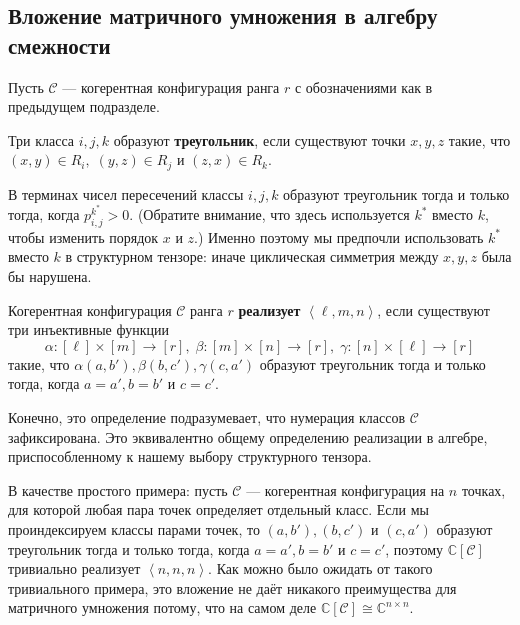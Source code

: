 \subsection{Вложение матричного умножения в алгебру смежности}\label{ssub:12:4.4}

Пусть $\mathscr{C}$ --- когерентная конфигурация ранга $r$ с обозначениями как в предыдущем подразделе.

\begin{definition}\label{def:12:4.4}
     Три класса $i,j,k$ образуют \textbf{треугольник}, если существуют точки $x,y,z$ такие, что $(x,y) \in R_i,\; (y,z) \in R_j$ и $(z,x) \in R_k$.
\end{definition}

В терминах чисел пересечений классы $i,j,k$ образуют треугольник тогда и только тогда, когда $p_{i,j}^{k^*} > 0$. (Обратите внимание, что здесь используется $k^*$ вместо $k$, чтобы изменить порядок $x$ и $z$.) Именно поэтому мы предпочли использовать $k^*$ вместо $k$ в структурном тензоре: иначе циклическая симметрия между $x,y,z$ была бы нарушена.

\begin{definition}\label{def:12:4.5}
     Когерентная конфигурация $\mathscr{C}$ ранга $r$ \textbf{реализует} $\left\langle \ell,m,n \right\rangle$, если существуют три инъективные функции
     \[
     	\alpha: [\ell] \times [m] \to [r], \; \beta: [m] \times [n] \to [r], \; \gamma: [n] \times [\ell] \to [r]
     \]
     такие, что $\alpha(a,b'), \beta(b,c'), \gamma(c,a')$ образуют треугольник тогда и только тогда, когда $a=a', b=b'$ и $c=c'$.
\end{definition}

Конечно, это определение подразумевает, что нумерация классов $\mathscr{C}$ зафиксирована. Это эквивалентно общему определению реализации в алгебре, приспособленному к нашему выбору структурного тензора.

\begin{example}\label{ex:12:4.6}
  В качестве простого примера: пусть $\mathscr{C}$ --- когерентная конфигурация на $n$ точках, для которой любая пара точек определяет отдельный класс. Если мы проиндексируем классы парами точек, то $(a,b'), (b,c')$ и $(c,a')$ образуют треугольник тогда и только тогда, когда $a=a',b=b'$ и $c=c'$, поэтому $\mathbb{C}[\mathscr{C}]$ тривиально реализует $\left\langle n,n,n \right\rangle$. Как можно было ожидать от такого тривиального примера, это вложение не даёт никакого преимущества для матричного умножения потому, что на самом деле $\mathbb{C}[\mathscr{C}] \cong \mathbb{C}^{n \times n}$.
\end{example}

